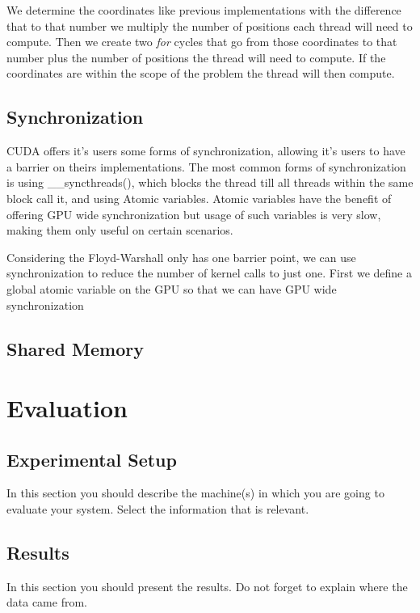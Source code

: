 \documentclass[runningheads]{llncs}
\begin{document}
We determine the coordinates like previous implementations with the difference that to that number we multiply the number of positions each thread will need to compute. %
Then we create two \textit{for} cycles that go from those coordinates to that number plus the number of positions the thread will need to compute. If the coordinates are within the scope of the problem the thread will then compute.

\subsection{Synchronization}

CUDA offers it's users some forms of synchronization, allowing it's users to have a barrier on theirs implementations.
The most common forms of synchronization is using \_\_syncthreads(), which blocks the thread till all threads within the same block call it, and using Atomic variables. Atomic variables have the benefit of offering GPU wide synchronization but usage of such variables is very slow, making them only useful on certain scenarios.

Considering the Floyd-Warshall only has one barrier point, we can use synchronization to reduce the number of kernel calls to just one.
First we define a global atomic variable on the GPU so that we can have GPU wide synchronization

\subsection{Shared Memory}


\section{Evaluation}

\subsection{Experimental Setup}

In this section you should describe the machine(s) in which you are going to evaluate your system. Select the information that is relevant.


\subsection{Results}

In this section you should present the results. Do not forget to explain where the data came from. 
\end{document}
